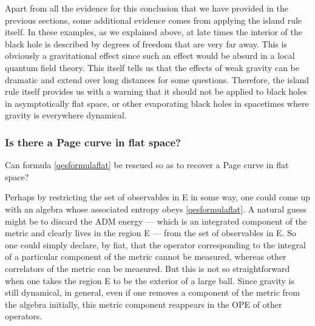 \documentclass[12pt]{article}
\begin{document}
Apart from all the evidence for this conclusion that we have provided in the previous sections,  some additional evidence comes from applying the island rule itself. In these examples, as we explained above, at late times the  interior of the black hole is described by degrees of freedom that are very far away.  This is obviously a gravitational effect since such an effect would be absurd in a local quantum field theory. This itself tells us that the effects of weak gravity can be dramatic and extend over long distances for some questions.  Therefore, the island rule itself provides us with a warning that it should not be applied to black holes in asymptotically flat space, or other evaporating black holes in spacetimes  where gravity is everywhere dynamical.

\subsubsection{Is there a Page curve in flat space? \label{secispageflat}}
Can formula \eqref{qesformulaflat} be rescued so as to recover a Page curve in flat space?

Perhaps by restricting the set of observables in E in some way, one could come up with an algebra whose associated entropy obeys \eqref{qesformulaflat}. A natural guess might be to discard the ADM energy  --- which is an integrated component of the metric and clearly lives in the region E --- from the set of observables in E. So one could simply declare, by fiat, that the operator corresponding to the integral of a particular component of the metric cannot be measured, whereas other correlators of the metric can be measured.  But this is not so straightforward when one takes the region E to be the exterior of a large ball. Since gravity is still dynamical, in general, even if one removes a component of the metric from the algebra initially, this metric component reappears in the OPE of other operators.
\end{document}
